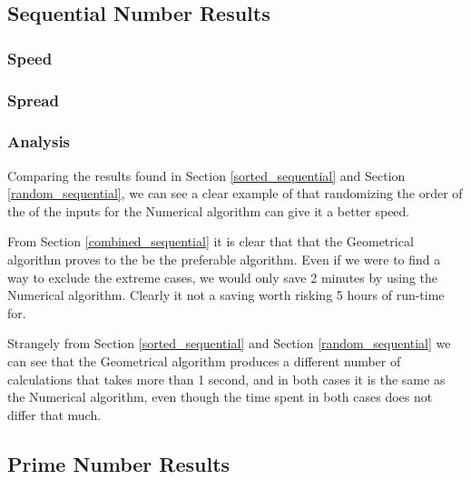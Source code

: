 

\subsection{Sequential Number Results}

\subsubsection*{Speed}
\FloatBarrier
\label{sorted_sequential}

\label{random_sequential}

\label{combined_sequential}

\FloatBarrier
\subsubsection*{Spread}
\FloatBarrier



\FloatBarrier
\subsubsection*{Analysis}
Comparing the results found in Section \ref{sorted_sequential} and Section \ref{random_sequential}, we can see a clear example of that randomizing the order of the of the inputs for the Numerical algorithm can give it a better speed.

From Section \ref{combined_sequential} it is clear that that the Geometrical algorithm proves to the be the preferable algorithm. Even if we were to find a way to exclude the extreme cases, we would only save 2 minutes by using the Numerical algorithm. Clearly it not a saving worth risking 5 hours of run-time for. 

Strangely from Section \ref{sorted_sequential} and Section \ref{random_sequential} we can see that the Geometrical algorithm produces a different number of calculations that takes more than 1 second, and in both cases it is the same as the Numerical algorithm, even though the time spent in both cases does not differ that much.

\subsection{Prime Number Results}

